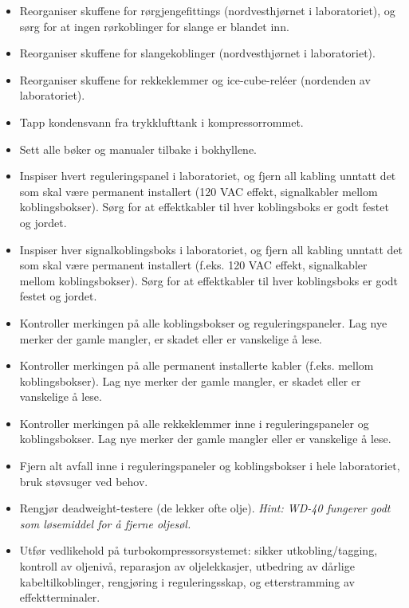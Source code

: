 \begin{itemize}
\item{} \underbar{\hskip 50pt} Reorganiser skuffene for rørgjengefittings (nordvesthjørnet i laboratoriet), og sørg for at ingen rørkoblinger for slange er blandet inn.
\item{} \underbar{\hskip 50pt} Reorganiser skuffene for slangekoblinger (nordvesthjørnet i laboratoriet).
\item{} \underbar{\hskip 50pt} Reorganiser skuffene for rekkeklemmer og ice-cube-reléer (nordenden av laboratoriet).
\item{} \underbar{\hskip 50pt} Tapp kondensvann fra trykklufttank i kompressorrommet.
\item{} \underbar{\hskip 50pt} Sett alle bøker og manualer tilbake i bokhyllene.
\item{} \underbar{\hskip 50pt} Inspiser hvert reguleringspanel i laboratoriet, og fjern all kabling unntatt det som skal være permanent installert (120 VAC effekt, signalkabler mellom koblingsbokser). Sørg for at effektkabler til hver koblingsboks er godt festet og jordet.
\item{} \underbar{\hskip 50pt} Inspiser hver signalkoblingsboks i laboratoriet, og fjern all kabling unntatt det som skal være permanent installert (f.eks. 120 VAC effekt, signalkabler mellom koblingsbokser). Sørg for at effektkabler til hver koblingsboks er godt festet og jordet.
\item{} \underbar{\hskip 50pt} Kontroller merkingen på alle koblingsbokser og reguleringspaneler. Lag nye merker der gamle mangler, er skadet eller er vanskelige å lese.
\item{} \underbar{\hskip 50pt} Kontroller merkingen på alle permanent installerte kabler (f.eks. mellom koblingsbokser). Lag nye merker der gamle mangler, er skadet eller er vanskelige å lese.
\item{} \underbar{\hskip 50pt} Kontroller merkingen på alle rekkeklemmer inne i reguleringspaneler og koblingsbokser. Lag nye merker der gamle mangler eller er vanskelige å lese.
\item{} \underbar{\hskip 50pt} Fjern alt avfall inne i reguleringspaneler og koblingsbokser i hele laboratoriet, bruk støvsuger ved behov.
\item{} \underbar{\hskip 50pt} Rengjør deadweight-testere (de lekker ofte olje). {\it Hint: WD-40 fungerer godt som løsemiddel for å fjerne oljesøl.}
\item{} \underbar{\hskip 50pt} Utfør vedlikehold på turbokompressorsystemet: sikker utkobling/tagging, kontroll av oljenivå, reparasjon av oljelekkasjer, utbedring av dårlige kabeltilkoblinger, rengjøring i reguleringsskap, og etterstramming av effektterminaler.

\end{itemize}
